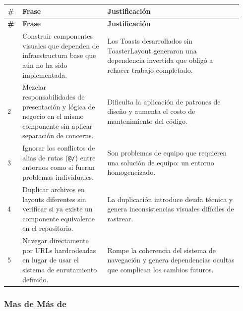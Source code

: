 \documentclass[11pt,a4paper]{article}
\begin{document}
\begingroup
\scriptsize
\setlength{\tabcolsep}{3pt}
\begin{longtable}{P{0.06\linewidth}P{0.34\linewidth}P{0.54\linewidth}}
\toprule
\textbf{\#} & \textbf{Frase} & \textbf{Justificación} \\
\midrule
\endfirsthead
\toprule
\textbf{\#} & \textbf{Frase} & \textbf{Justificación} \\
\midrule
\endhead
\bottomrule
{} & Construir componentes visuales que dependen de infraestructura base que aún no ha sido implementada. & Los Toasts desarrollados sin ToasterLayout generaron una dependencia invertida que obligó a rehacer trabajo completado. \\
2 & Mezclar responsabilidades de presentación y lógica de negocio en el mismo componente sin aplicar separación de concerns. & Dificulta la aplicación de patrones de diseño y aumenta el costo de mantenimiento del código. \\
3 & Ignorar los conflictos de alias de rutas (\texttt{@/}) entre entornos como si fueran problemas individuales. & Son problemas de equipo que requieren una solución de equipo: un entorno homogeneizado. \\
4 & Duplicar archivos en layouts diferentes sin verificar si ya existe un componente equivalente en el repositorio. & La duplicación introduce deuda técnica y genera inconsistencias visuales difíciles de rastrear. \\
5 & Navegar directamente por URLs hardcodeadas en lugar de usar el sistema de enrutamiento definido. & Rompe la coherencia del sistema de navegación y genera dependencias ocultas que complican los cambios futuros. \\
\end{longtable}
\endgroup

\subsubsection{Mas de Más de}
\end{document}
